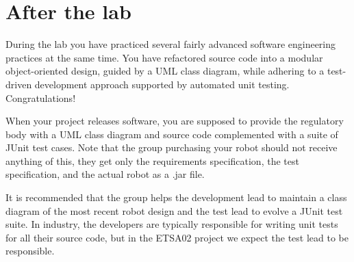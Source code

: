 \documentclass{scrreprt}
\begin{document}
\chapter{After the lab}
During the lab you have practiced several fairly advanced software engineering practices at the same time. You have refactored source code into a modular object-oriented design, guided by a UML class diagram, while adhering to a test-driven development approach supported by automated unit testing. Congratulations!

When your project releases software, you are supposed to provide the regulatory body with a UML class diagram and source code complemented with a suite of JUnit test cases. Note that the group purchasing your robot should not receive anything of this, they get only the requirements specification, the test specification, and the actual robot as a .jar file.

It is recommended that the group helps the development lead to maintain a class diagram of the most recent robot design and the test lead to evolve a JUnit test suite. In industry, the developers are typically responsible for writing unit tests for all their source code, but in the ETSA02 project we expect the test lead to be responsible. 
\end{document}
